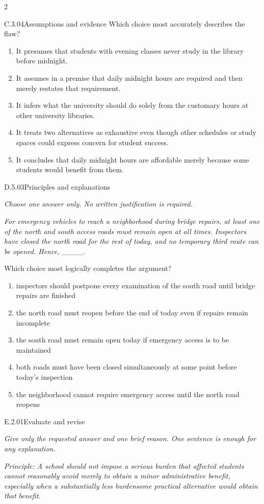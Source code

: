 \documentclass[9pt]{extarticle}
\newcommand{\choice}[1]{\item #1}
\begin{document}
\begin{multicols}{2}
\begin{DenseCoreProblem}{C.3.04}{Assumptions and evidence}
Which choice most accurately describes the flaw?
\begin{enumerate}[label=(\alph*)]
  \choice{It presumes that students with evening classes never study in the library before midnight.}
  \choice{It assumes in a premise that daily midnight hours are required and then merely restates that requirement.}
  \choice{It infers what the university should do solely from the customary hours at other university libraries.}
  \choice{It treats two alternatives as exhaustive even though other schedules or study spaces could express concern for student success.}
  \choice{It concludes that daily midnight hours are affordable merely because some students would benefit from them.}
\end{enumerate}
\end{DenseCoreProblem}
\begin{DenseCoreProblem}{D.5.03}{Principles and explanations}
{\scriptsize\textit{Choose one answer only. No written justification is required.}\par}
\emph{For emergency vehicles to reach a neighborhood during bridge repairs, at least one of the north and south access roads must remain open at all times. Inspectors have closed the north road for the rest of today, and no temporary third route can be opened. Hence, \_\_\_\_.}

Which choice most logically completes the argument?
\begin{enumerate}[label=(\alph*)]
  \choice{inspectors should postpone every examination of the south road until bridge repairs are finished}
  \choice{the north road must reopen before the end of today even if repairs remain incomplete}
  \choice{the south road must remain open today if emergency access is to be maintained}
  \choice{both roads must have been closed simultaneously at some point before today's inspection}
  \choice{the neighborhood cannot require emergency access until the north road reopens}
\end{enumerate}
\end{DenseCoreProblem}
\begin{DenseCoreProblem}{E.2.01}{Evaluate and revise}
{\scriptsize\textit{Give only the requested answer and one brief reason. One sentence is enough for any explanation.}\par}
\emph{Principle: A school should not impose a serious burden that affected students cannot reasonably avoid merely to obtain a minor administrative benefit, especially when a substantially less burdensome practical alternative would obtain that benefit.}


\end{DenseCoreProblem}
\end{multicols}
\end{document}

